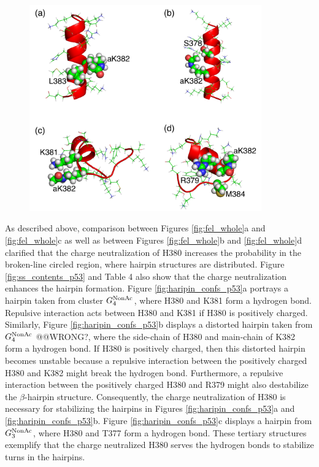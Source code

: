 \begin{figure}
  \centering
  \includegraphics[width=10cm]{../single_CTD/figures_p53ctd/6.pdf}
  \caption{\label{fig:repres_struct_in_G}}
\end{figure}

As described above, comparison between Figures \ref{fig:fel_whole}a and \ref{fig:fel_whole}c as well as between Figures \ref{fig:fel_whole}b and \ref{fig:fel_whole}d clarified that the charge neutralization of H380 increases the probability in the broken-line circled region, where hairpin structures are distributed. Figure \ref{fig:ss_contents_p53} and Table 4 also show that the charge neutralization enhances the hairpin formation. Figure \ref{fig:haripin_confs_p53}a portrays a hairpin taken from cluster $G^{\rm NonAc}_4$, where H380 and K381 form a hydrogen bond. Repulsive interaction acts between H380 and K381 if H380 is positively charged. Similarly, Figure \ref{fig:haripin_confs_p53}b displays a distorted hairpin taken from $G^{\rm NonAc}_4$ @@WRONG?, where the side-chain of H380 and main-chain of K382 form a hydrogen bond. If H380 is positively charged, then this distorted hairpin becomes unstable because a repulsive interaction between the positively charged H380 and K382 might break the hydrogen bond. Furthermore, a repulsive interaction between the positively charged H380 and R379 might also destabilize the $\beta$-hairpin structure. Consequently, the charge neutralization of H380 is necessary for stabilizing the hairpins in Figures \ref{fig:haripin_confs_p53}a and \ref{fig:haripin_confs_p53}b. Figure \ref{fig:haripin_confs_p53}c displays a hairpin from $G^{\rm NonAc}_3$, where H380 and T377 form a hydrogen bond. These tertiary structures exemplify that the charge neutralized H380 serves the hydrogen bonds to stabilize turns in the hairpins.


